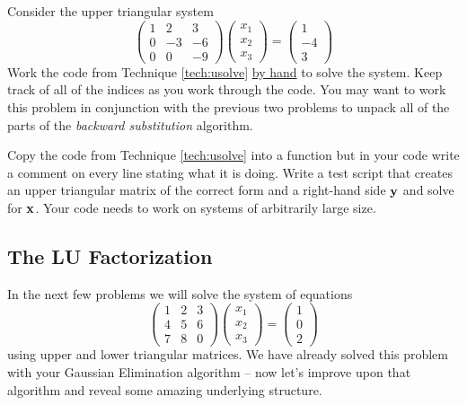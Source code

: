 \begin{problem}
    Consider the upper triangular system
    \[ \begin{pmatrix} 1 & 2 & 3 \\ 0 & -3 & -6 \\ 0 & 0 & -9 \end{pmatrix}
        \begin{pmatrix} x_1 \\ x_2 \\ x_3 \end{pmatrix} = \begin{pmatrix} 1 \\ -4 \\
        3\end{pmatrix} \]
    Work the code from Technique \ref{tech:usolve} \underline{by hand} to solve the
    system.  Keep track of all of the indices as you work through the code.  You may want
    to work this problem in conjunction with the previous two problems to unpack all of
    the parts of the {\it backward substitution} algorithm.
\end{problem}

\begin{problem}
    Copy the code from Technique \ref{tech:usolve} into a \ProgLang function but in your code
    write a comment on every line stating what it is doing.  Write a test script that
    creates an upper triangular matrix of the correct form and a right-hand side ${\bf y}$ and
    solve for ${\bf x}$.  Your code needs to work on systems of arbitrarily large size.
\end{problem}

\subsection{The LU Factorization}
In the next few problems we will solve the system of equations
\[ \begin{pmatrix} 1 & 2 & 3 \\ 4 & 5 & 6 \\ 7 & 8 & 0 \end{pmatrix} \begin{pmatrix} x_1
    \\ x_2 \\ x_3 \end{pmatrix} = \begin{pmatrix} 1 \\ 0 \\ 2 \end{pmatrix} \]
using upper and lower triangular matrices.  We have already solved this problem with your
Gaussian Elimination algorithm -- now let's improve upon that algorithm and reveal some
amazing underlying structure.

